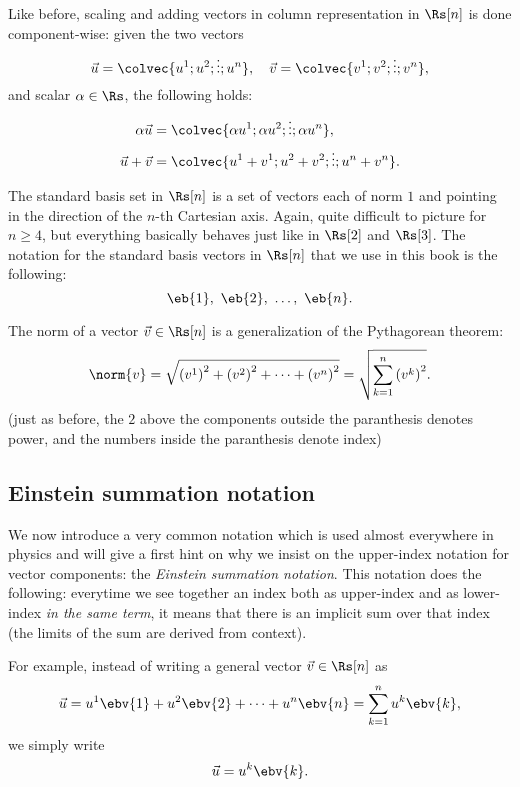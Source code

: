 Like before, scaling and adding vectors in column representation in $\Rs[n]$ is done component-wise: given the two vectors
\[
  \vec{u}=\colvec{u^{1};u^{2};\vdots;u^{n}},\quad \vec{v}=\colvec{v^{1};v^{2};\vdots;v^{n}},
\]
and scalar $\alpha\in\Rs$, the following holds:
\begin{align}
  \alpha \vec{u} &= \colvec{\alpha u^{1};\alpha u^{2};\vdots;\alpha u^{n}},\\
  \vec{u}+\vec{v} &= \colvec{u^{1}+v^{1};u^{2}+v^{2};\vdots;u^{n}+v^{n}}.
\end{align}

The standard basis set in $\Rs[n]$ is a set of vectors each of norm $1$ and pointing in the direction of the $n$-th Cartesian axis. Again, quite difficult to picture for $n\geq4$, but everything basically behaves just like in $\Rs[2]$ and $\Rs[3]$. The notation for the standard basis vectors in $\Rs[n]$ that we use in this book is the following:
\begin{equation}
  \eb{1},\ \eb{2},\ \dots,\ \eb{n}.
  \label{eq:std_basis_vecs_Rn}
\end{equation}

The norm of a vector $\vec{v}\in\Rs[n]$ is a generalization of the Pythagorean theorem:
\begin{equation}
  \norm{v} = \sqrt{\left(v^{1}\right)^{2} + \left(v^{2}\right)^{2} + \cdots + \left(v^{n}\right)^{2}} = \sqrt{\sum\limits_{k=1}^{n}\left(v^{k}\right)^{2}}.
  \label{eq:norm_Rs}
\end{equation}
(just as before, the $2$ above the components outside the paranthesis denotes power, and the numbers inside the paranthesis denote index)

\subsection{Einstein summation notation}
We now introduce a very common notation which is used almost everywhere in physics and will give a first hint on why we insist on the upper-index notation for vector components: the \emph{Einstein summation notation}. This notation does the following: everytime we see together an index both as upper-index and as lower-index \textit{in the same term}, it means that there is an implicit sum over that index (the limits of the sum are derived from context).

For example, instead of writing a general vector $\vec{v}\in\Rs[n]$ as
\[
  \vec{u} = u^{1}\ebv{1} + u^{2}\ebv{2} + \cdots + u^{n}\ebv{n} = \sum\limits_{k=1}^{n}u^{k}\ebv{k},
\]
we simply write
\begin{equation}
  \vec{u} = u^{k}\ebv{k}.
  \label{eq:Einstein_notation_vec_Rn}
\end{equation}

